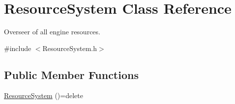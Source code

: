 \hypertarget{class_resource_system}{}\section{Resource\+System Class Reference}
\label{class_resource_system}


Overseer of all engine resources.  




{\ttfamily \#include $<$Resource\+System.\+h$>$}

\subsection*{Public Member Functions}
\begin{DoxyCompactItemize}
\item 
\mbox{\hyperlink{class_resource_system_a635cbc11ec235e902cfd689371a3abec}{Resource\+System}} ()=delete
\end{DoxyCompactItemize}

